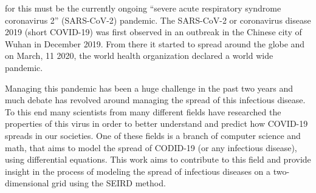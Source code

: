 for this must be the currently ongoing ``severe acute respiratory syndrome coronavirus 2'' (SARS-CoV-2) pandemic. The SARS-CoV-2 or
coronavirus disease 2019 (short COVID-19) was first observed in an outbreak in the Chinese city of Wuhan in December 2019\cite{??}.
From there it started to spread around the globe and on March, 11 2020, the world health organization declared a world wide pandemic\cite{??}.\newline
\par
Managing this pandemic has been a huge challenge in the past two years and much debate has revolved around managing the spread of this
infectious disease. To this end many scientists from many different fields have researched the properties of this virus in order to better
understand and predict how COVID-19 spreads in our societies. One of these fields is a branch of computer science and math, that aims to
model the spread of CODID-19 (or any infectious disease), using differential equations. This work aims to contribute to this field and
provide insight in the process of modeling the spread of infectious diseases on a two-dimensional grid using the SEIRD method.




